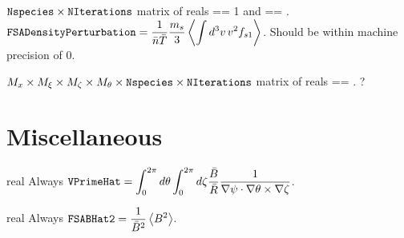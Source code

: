 \myhrule

{$\text{\ttfamily Nspecies} \times \text{\ttfamily NIterations}$ matrix of reals}
{ == 1 and  == \true.}
{$\displaystyle \text{\ttfamily FSADensityPerturbation} =  \frac{1}{\bar{n} \bar{T}} \frac{m_s}{3} \left\langle \int d^3v \, v^2 f_{s1} \right\rangle$. 
Should be within machine precision of 0.}

\myhrule

{$M_x \times M_{\xi} \times M_{\zeta} \times M_{\theta} \times \text{\ttfamily Nspecies} \times \text{\ttfamily NIterations}$ matrix of reals}
{ == \true.}
{?}

\myhrule

\section{Miscellaneous}

\myhrule

{real}
{Always}
{$\displaystyle \text{\ttfamily VPrimeHat} =  \int_{0}^{2 \pi} d \theta \int_{0}^{2 \pi} d \zeta \frac{\bar{B}}{\bar{R}} \frac{1}{\nabla \psi \cdot \nabla \theta \times \nabla \zeta}$.}

\myhrule

{real}
{Always}
{$\displaystyle \text{\ttfamily FSABHat2} =  \frac{1}{\bar{B}^2} \left\langle B^2 \right\rangle$.}

\myhrule

%
%
%

